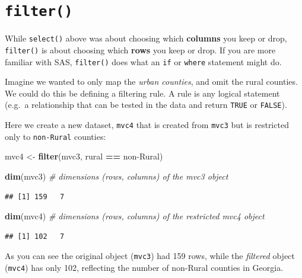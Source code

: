 \documentclass[
]{book}
\newenvironment{Shaded}{\begin{snugshade}}{\end{snugshade}}
\newcommand{\CommentTok}[1]{\textcolor[rgb]{0.56,0.35,0.01}{\textit{#1}}}
\newcommand{\FunctionTok}[1]{\textcolor[rgb]{0.13,0.29,0.53}{\textbf{#1}}}
\newcommand{\NormalTok}[1]{#1}
\newcommand{\OtherTok}[1]{\textcolor[rgb]{0.56,0.35,0.01}{#1}}
\newcommand{\SpecialCharTok}[1]{\textcolor[rgb]{0.81,0.36,0.00}{\textbf{#1}}}
\newcommand{\StringTok}[1]{\textcolor[rgb]{0.31,0.60,0.02}{#1}}
\begin{document}
\hypertarget{filter}{%
\section{\texorpdfstring{\texttt{filter()}}{filter()}}\label{filter}}

While \texttt{select()} above was about choosing which \textbf{columns} you keep or drop, \texttt{filter()} is about choosing which \textbf{rows} you keep or drop. If you are more familiar with SAS, \texttt{filter()} does what an \texttt{if} or \texttt{where} statement might do.

Imagine we wanted to only map the \emph{urban counties}, and omit the rural counties. We could do this be defining a filtering rule. A rule is any logical statement (e.g.~a relationship that can be tested in the data and return \texttt{TRUE} or \texttt{FALSE}).

Here we create a new dataset, \texttt{mvc4} that is created from \texttt{mvc3} but is restricted only to \texttt{non-Rural} counties:

\begin{Shaded}
\begin{Highlighting}[]
\NormalTok{mvc4 }\OtherTok{\textless{}{-}} \FunctionTok{filter}\NormalTok{(mvc3, rural }\SpecialCharTok{==} \StringTok{\textquotesingle{}non{-}Rural\textquotesingle{}}\NormalTok{)}


\FunctionTok{dim}\NormalTok{(mvc3) }\CommentTok{\# dimensions (rows, columns) of the mvc3 object}
\end{Highlighting}
\end{Shaded}

\begin{verbatim}
## [1] 159   7
\end{verbatim}

\begin{Shaded}
\begin{Highlighting}[]
\FunctionTok{dim}\NormalTok{(mvc4) }\CommentTok{\# dimensions (rows, columns) of the restricted mvc4 object}
\end{Highlighting}
\end{Shaded}

\begin{verbatim}
## [1] 102   7
\end{verbatim}

As you can see the original object (\texttt{mvc3}) had 159 rows, while the \emph{filtered} object (\texttt{mvc4}) has only 102, reflecting the number of non-Rural counties in Georgia.
\end{document}
